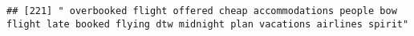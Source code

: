 \documentclass[
]{article}
\begin{document}
\begin{verbatim}
## [221] " overbooked flight offered cheap accommodations people bow flight late booked flying dtw midnight plan vacations airlines spirit"                                                                                                                                                                                                                                                                                                                                                                                                                                                                                                                                                                                                                                                                                                                                                                                                                                                                                                                                                                                                                                                                                                                                                                                                                                                                                                                                                                                                                                                                                                                                                                                                                                                              

\end{verbatim}
\end{document}
